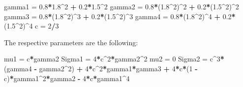 \documentclass[
]{article}
\newenvironment{Shaded}{\begin{snugshade}}{\end{snugshade}}
\newcommand{\DecValTok}[1]{\textcolor[rgb]{0.00,0.00,0.81}{#1}}
\newcommand{\FloatTok}[1]{\textcolor[rgb]{0.00,0.00,0.81}{#1}}
\newcommand{\NormalTok}[1]{#1}
\newcommand{\OtherTok}[1]{\textcolor[rgb]{0.56,0.35,0.01}{#1}}
\newcommand{\SpecialCharTok}[1]{\textcolor[rgb]{0.81,0.36,0.00}{\textbf{#1}}}
\begin{document}
\begin{Shaded}
\begin{Highlighting}[]
\NormalTok{gamma1 }\OtherTok{=} \FloatTok{0.8}\SpecialCharTok{*}\FloatTok{1.8}\SpecialCharTok{\^{}}\DecValTok{2} \SpecialCharTok{+} \FloatTok{0.2}\SpecialCharTok{*}\FloatTok{1.5}\SpecialCharTok{\^{}}\DecValTok{2}
\NormalTok{gamma2 }\OtherTok{=} \FloatTok{0.8}\SpecialCharTok{*}\NormalTok{(}\FloatTok{1.8}\SpecialCharTok{\^{}}\DecValTok{2}\NormalTok{)}\SpecialCharTok{\^{}}\DecValTok{2} \SpecialCharTok{+} \FloatTok{0.2}\SpecialCharTok{*}\NormalTok{(}\FloatTok{1.5}\SpecialCharTok{\^{}}\DecValTok{2}\NormalTok{)}\SpecialCharTok{\^{}}\DecValTok{2}
\NormalTok{gamma3 }\OtherTok{=} \FloatTok{0.8}\SpecialCharTok{*}\NormalTok{(}\FloatTok{1.8}\SpecialCharTok{\^{}}\DecValTok{2}\NormalTok{)}\SpecialCharTok{\^{}}\DecValTok{3} \SpecialCharTok{+} \FloatTok{0.2}\SpecialCharTok{*}\NormalTok{(}\FloatTok{1.5}\SpecialCharTok{\^{}}\DecValTok{2}\NormalTok{)}\SpecialCharTok{\^{}}\DecValTok{3}
\NormalTok{gamma4 }\OtherTok{=} \FloatTok{0.8}\SpecialCharTok{*}\NormalTok{(}\FloatTok{1.8}\SpecialCharTok{\^{}}\DecValTok{2}\NormalTok{)}\SpecialCharTok{\^{}}\DecValTok{4} \SpecialCharTok{+} \FloatTok{0.2}\SpecialCharTok{*}\NormalTok{(}\FloatTok{1.5}\SpecialCharTok{\^{}}\DecValTok{2}\NormalTok{)}\SpecialCharTok{\^{}}\DecValTok{4}
\NormalTok{c }\OtherTok{=} \DecValTok{2}\SpecialCharTok{/}\DecValTok{3}
\end{Highlighting}
\end{Shaded}

The respective parameters are the following:

\begin{Shaded}
\begin{Highlighting}[]
\NormalTok{mu1 }\OtherTok{=}\NormalTok{ c}\SpecialCharTok{*}\NormalTok{gamma2}
\NormalTok{Sigma1 }\OtherTok{=} \DecValTok{4}\SpecialCharTok{*}\NormalTok{c}\SpecialCharTok{\^{}}\DecValTok{2}\SpecialCharTok{*}\NormalTok{gamma2}\SpecialCharTok{\^{}}\DecValTok{2}
\NormalTok{mu2 }\OtherTok{=} \DecValTok{0}
\NormalTok{Sigma2 }\OtherTok{=}\NormalTok{ c}\SpecialCharTok{\^{}}\DecValTok{3}\SpecialCharTok{*}\NormalTok{(gamma4 }\SpecialCharTok{{-}}\NormalTok{ gamma2}\SpecialCharTok{\^{}}\DecValTok{2}\NormalTok{) }\SpecialCharTok{+} \DecValTok{4}\SpecialCharTok{*}\NormalTok{c}\SpecialCharTok{\^{}}\DecValTok{2}\SpecialCharTok{*}\NormalTok{gamma1}\SpecialCharTok{*}\NormalTok{gamma3 }\SpecialCharTok{+} \DecValTok{4}\SpecialCharTok{*}\NormalTok{c}\SpecialCharTok{*}\NormalTok{(}\DecValTok{1} \SpecialCharTok{{-}}\NormalTok{ c)}\SpecialCharTok{*}\NormalTok{gamma1}\SpecialCharTok{\^{}}\DecValTok{2}\SpecialCharTok{*}\NormalTok{gamma2 }\SpecialCharTok{{-}} \DecValTok{4}\SpecialCharTok{*}\NormalTok{c}\SpecialCharTok{*}\NormalTok{gamma1}\SpecialCharTok{\^{}}\DecValTok{4}
\end{Highlighting}
\end{Shaded}
\end{document}
